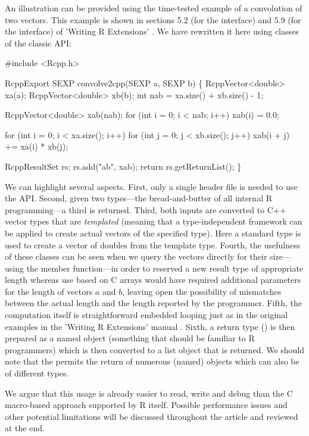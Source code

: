 An illustration can be provided using the time-tested example of a
convolution of two vectors. This example is shown in sections 5.2 (for the
 interface) and 5.9 (for the  interface) of 'Writing
R Extensions' \citep{R:exts}. We have rewritten it here using classes of the
classic  API:

\begin{example}
#include <Rcpp.h>

RcppExport SEXP convolve2cpp(SEXP a, SEXP b) \{
  RcppVector<double> xa(a);
  RcppVector<double> xb(b);
  int nab = xa.size() + xb.size() - 1;

  RcppVector<double> xab(nab);
  for (int i = 0; i < nab; i++) xab(i) = 0.0;

  for (int i = 0; i < xa.size(); i++)
    for (int j = 0; j < xb.size(); j++) 
       xab(i + j) += xa(i) * xb(j);

  RcppResultSet rs;
  rs.add("ab", xab);
  return rs.getReturnList();
\}
\end{example}

We can highlight several aspects. First, only a single header file
 is needed to use the  API.  Second, given two
 types---the bread-and-butter of all internal R programming---a
third is returned.  Third, both inputs are converted to C++ vector types that
are \textsl{templated} (meaning that a type-independent framework can be
applied to create actual vectors of the specified type). Here a standard 
type is used to create a vector of doubles from the template type.
Fourth, the usefulness of these classes can be seen when we query the
vectors directly for their size---using the  member function---in
order to reserved a new result type of appropriate length whereas use based
on C arrays would have required additional parameters for the length of
vectors $a$ and $b$, leaving open the possibility of mismatches between the
actual length and the length reported by the programmer.  Fifth, the
computation itself is straightforward embedded looping just as in the
original examples in the 'Writing R Extensions' manual \citep{R:exts}.
Sixth, a return type () is then prepared as a named
object (something that should be familiar to R programmers) which is then
converted to a list object that is returned.  We should note that the
 permits the return of numerous (named) objects which can
also be of different types.

We argue that this usage is already easier to read, write and debug than the
C macro-based approach supported by R itself. Possible performance issues and
other potential limitations will be discussed throughout the article and
reviewed at the end.

